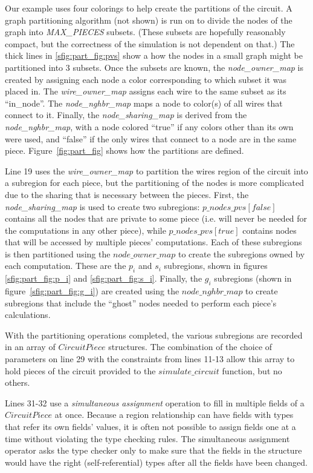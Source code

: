 Our example uses four colorings to help create the partitions of the circuit.
A graph partitioning algorithm
(not shown) is run on to divide the nodes of the graph into \emph{MAX\_PIECES}
subsets.  (These subsets are hopefully reasonably compact, but the correctness
of the simulation is not dependent on that.)  The thick lines in \ref{sfig:part_fig:pvs}
show a how the nodes in a small graph might be partitioned into 3 subsets.
Once the subsets are known, the \emph{node\_owner\_map} is created by assigning
each node a color corresponding to which subset it was placed in.  The 
\emph{wire\_owner\_map} assigns each wire to the same subset as its ``in\_node''.
The \emph{node\_nghbr\_map} maps a node to color(s) of all wires that 
connect to it.  Finally, the \emph{node\_sharing\_map} is derived from the
\emph{node\_nghbr\_map}, with a node colored ``true'' if any colors other than 
its own were used, and ``false'' if the only wires that connect to a node are
in the same piece.
Figure~\ref{fig:part_fig} shows how the partitions are defined.

Line 19 uses the \emph{wire\_owner\_map} to partition the wires region of the
circuit into a subregion for each piece, but the partitioning of the nodes is
more complicated due to the sharing that is necessary between the pieces.
First, the \emph{node\_sharing\_map} is used to create two subregions: $p\_nodes\_pvs[false]$ contains all the nodes that are private to some piece (i.e. will
never be needed for the computations in any other piece), while $p\_nodes\_pvs[true]$ contains nodes that will be accessed by multiple pieces' computations.
Each of these subregions is then partitioned using the $node\_owner\_map$ to
create the subregions owned by each computation.  These are the $p_i$ and $s_i$
subregions, shown in figures \ref{sfig:part_fig:p_i} and \ref{sfig:part_fig:s_i}.  Finally, the $g_i$ subregions (shown in figure~\ref{sfig:part_fig:g_i}) are
created using the $node\_nghbr\_map$ to 
create subregions that include the ``ghost'' nodes needed to perform each
piece's calculations.

With the partitioning operations completed, the various subregions are
recorded in an array of $CircuitPiece$ structures.  The combination of the
choice of parameters on line 29 with the constraints from lines 11-13 allow 
this array to hold pieces of the circuit provided to the $simulate\_circuit$
function, but no others.

Lines 31-32 use a \emph{simultaneous assignment} operation to fill in multiple
fields of a $CircuitPiece$ at once.  Because a region relationship can have
fields with types that refer its own fields' values, it is often not possible
to assign fields one at a time without violating the type checking rules.
The simultaneous assignment operator asks the type checker only to make sure
that the fields in the structure would have the right (self-referential) types
after all the fields have been changed.

